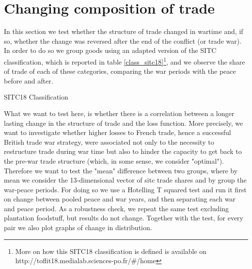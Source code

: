 \documentclass[12pt,a4paper,notitlepage,english]{article}
\begin{document}
\section{Changing composition of trade}  \label{composition}
In this section we test whether the structure of trade changed in wartime and, if so, whether the change was reversed after the end of the conflict (or trade war). \\
In order to do so we group goods using an adapted version of the SITC classification, which is reported in table \ref{class_sitc18}\footnote{More on how this SITC18 classification is defined is available on http://toflit18.medialab.sciences-po.fr/\#/home}, and we observe the share of trade of each of these categories, comparing the war periods with the peace before and after. 
\begin{table}[H]
\centering
\caption{SITC18 Classification}
\label{class_sitc18}

\end{table}
What we want to test here, is whether there is a correlation between a longer lasting change in the structure of trade and the loss function. More precisely, we want to investigate whether higher losses to French trade, hence a successful British trade war strategy, were associated not only to the necessity to restructure trade during war time but also to hinder the capacity to get back to the pre-war trade structure (which, in some sense, we consider "optimal"). Therefore we want to test the "mean" difference between two groups, where by mean we consider the 13-dimensional vector of 
sitc trade shares and by group the war-peace periods. For doing so we use a Hotelling T squared test and run it first on change between pooled peace and war years, and then separating each war and peace period. As a robustness check, we repeat the same test excluding plantation foodstuff, but results do not change. Together with the test, for every pair we also plot graphs of change in distribution. 
\end{document}
